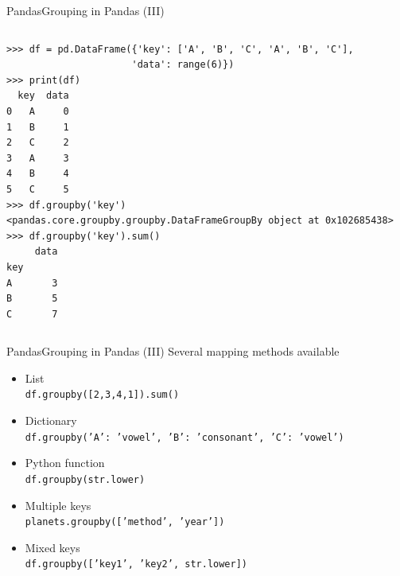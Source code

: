 \documentclass[10pt,compress]{beamer} %
\begin{document}
\begin{frame}[fragile]{Pandas}{Grouping in Pandas (III)}
	\vspace{-0.5cm}
	\begin{columns}
 	   \column{\textwidth}
		\begin{exampleblock}{}
		\vspace{-0.2cm} 
			\begin{lstlisting}
>>> df = pd.DataFrame({'key': ['A', 'B', 'C', 'A', 'B', 'C'],
                      'data': range(6)})
>>> print(df)
  key  data
0   A     0
1   B     1
2   C     2
3   A     3
4   B     4
5   C     5
>>> df.groupby('key')
<pandas.core.groupby.groupby.DataFrameGroupBy object at 0x102685438>
>>> df.groupby('key').sum()
     data
key      
A       3
B       5
C       7
			\end{lstlisting}
			\vspace{-0.2cm} 
		\end{exampleblock}
	\end{columns}
\end{frame}

\begin{frame}{Pandas}{Grouping in Pandas (III)}
	Several mapping methods available
	\begin{itemize}
		\item List\\
			  \texttt{df.groupby([2,3,4,1]).sum()}
		\item Dictionary \\
			  \texttt{df.groupby({'A': 'vowel', 'B': 'consonant', 'C': 'vowel'})}
		\item Python function \\
			  \texttt{df.groupby(str.lower)}
		\item Multiple keys \\
		      \texttt{planets.groupby(['method', 'year'])}
		\item Mixed keys \\
		      \texttt{df.groupby(['key1', 'key2', str.lower])}
	\end{itemize}
\end{frame}
\end{document}
